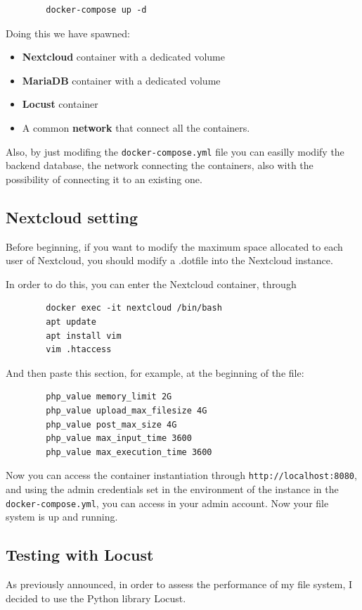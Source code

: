 \documentclass{article}
\begin{document}
	\begin{verbatim}
		docker-compose up -d
	\end{verbatim}
	
	Doing this we have spawned:
	\begin{itemize}
		\item \textbf{Nextcloud} container with a dedicated volume
		\item \textbf{MariaDB} container with a dedicated volume
		\item \textbf{Locust} container
		\item A common \textbf{network} that connect all the containers.
	\end{itemize}
	
	Also, by just modifing the \verb|docker-compose.yml| file you can easilly modify the backend database, the network connecting the containers, also with the possibility of connecting it to an existing one.
	
	\subsection{Nextcloud setting}
	Before beginning, if you want to modify the maximum space allocated to each user of Nextcloud, you should modify a .dotfile into the Nextcloud instance.
	
	In order to do this, you can enter the Nextcloud container, through
	\begin{verbatim}
		docker exec -it nextcloud /bin/bash
		apt update
		apt install vim
		vim .htaccess
	\end{verbatim}
	And then paste this section, for example, at the beginning of the file:
	\begin{verbatim}
		php_value memory_limit 2G
		php_value upload_max_filesize 4G
		php_value post_max_size 4G
		php_value max_input_time 3600
		php_value max_execution_time 3600
	\end{verbatim}
	
	Now you can access the container instantiation through \verb|http://localhost:8080|, and using the admin credentials set in the environment of the instance in the \verb|docker-compose.yml|, you can access in your admin account.
	Now your file system is up and running.
	
	\subsection{Testing with Locust}
	As previously announced, in order to assess the performance of my file system, I decided to use the Python library Locust.
	
\end{document}
